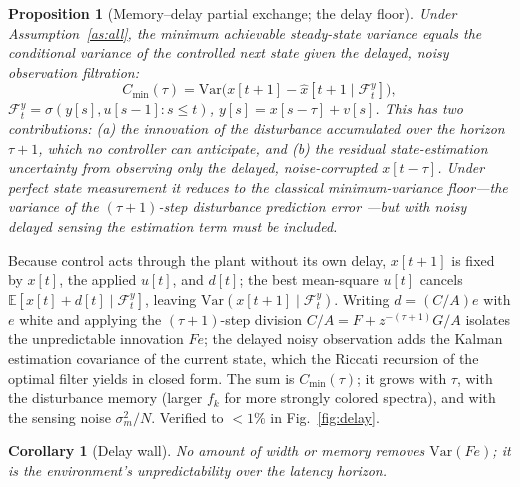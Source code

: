 \documentclass[journal]{IEEEtran}
\newtheorem{proposition}{Proposition}
\newtheorem{corollary}{Corollary}
\newcommand{\E}{\mathbb{E}}
\newcommand{\Var}{\mathrm{Var}}
\begin{document}
\begin{proposition}[Memory--delay partial exchange; the delay floor]\label{prop:delay}
Under Assumption~\ref{as:all}, the minimum achievable steady-state variance
equals the conditional variance of the controlled next state given the delayed,
noisy observation filtration:
\begin{equation}
C_{\min}(\tau) = \Var\!\big(x[t+1] - \hat{x}[t+1 \mid \mathcal{F}_t^y]\big),
\end{equation}
$\mathcal{F}_t^y = \sigma(y[s], u[s{-}1] : s \le t)$, $y[s]=x[s-\tau]+v[s]$. This
has two contributions: (a) the innovation of the disturbance accumulated over
the horizon $\tau+1$, which no controller can anticipate, and (b) the residual
state-estimation uncertainty from observing only the delayed, noise-corrupted
$x[t-\tau]$. Under perfect state measurement it reduces to the classical
minimum-variance floor---the variance of the $(\tau{+}1)$-step disturbance
prediction error \cite{astrom1970}---but with noisy delayed sensing the
estimation term must be included.
\end{proposition}
\begin{IEEEproof}
Because control acts through the plant without its own delay, $x[t+1]$ is fixed
by $x[t]$, the applied $u[t]$, and $d[t]$; the best mean-square $u[t]$ cancels
$\E[x[t]+d[t]\mid\mathcal{F}_t^y]$, leaving $\Var(x[t+1]\mid\mathcal{F}_t^y)$.
Writing $d=(C/A)e$ with $e$ white and applying the $(\tau{+}1)$-step division
$C/A = F + z^{-(\tau+1)}G/A$ isolates the unpredictable innovation $Fe$; the
delayed noisy observation adds the Kalman estimation covariance of the current
state, which the Riccati recursion of the optimal filter \cite{kalman1960}
yields in closed form. The sum is $C_{\min}(\tau)$; it grows with $\tau$, with
the disturbance memory (larger $f_k$ for more strongly colored spectra), and
with the sensing noise $\sigma_m^2/N$. Verified to $<1\%$ in
Fig.~\ref{fig:delay}.
\end{IEEEproof}

\begin{corollary}[Delay wall]
No amount of width or memory removes $\Var(Fe)$; it is the environment's
unpredictability over the latency horizon.
\end{corollary}
\end{document}
